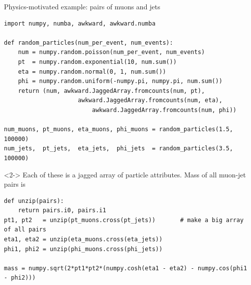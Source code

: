 \documentclass[aspectratio=169]{beamer}
\begin{document}
\begin{frame}[fragile]{Physics-motivated example: pairs of muons and jets}
\vspace{0.15 cm}
\scriptsize
\begin{verbatim}
import numpy, numba, awkward, awkward.numba

def random_particles(num_per_event, num_events):
    num = numpy.random.poisson(num_per_event, num_events)
    pt  = numpy.random.exponential(10, num.sum())
    eta = numpy.random.normal(0, 1, num.sum())
    phi = numpy.random.uniform(-numpy.pi, numpy.pi, num.sum())
    return (num, awkward.JaggedArray.fromcounts(num, pt),
                     awkward.JaggedArray.fromcounts(num, eta),
                         awkward.JaggedArray.fromcounts(num, phi))

num_muons, pt_muons, eta_muons, phi_muons = random_particles(1.5, 100000)
num_jets,  pt_jets,  eta_jets,  phi_jets  = random_particles(3.5, 100000)
\end{verbatim}

\vspace{0.35 cm}
\begin{uncoverenv}<2->
{\normalsize Each of these is a jagged array of particle attributes. Mass of all muon-jet pairs is}

\vspace{0.1 cm}
\begin{verbatim}
def unzip(pairs):
    return pairs.i0, pairs.i1
pt1, pt2   = unzip(pt_muons.cross(pt_jets))       # make a big array of all pairs
eta1, eta2 = unzip(eta_muons.cross(eta_jets))
phi1, phi2 = unzip(phi_muons.cross(phi_jets))

mass = numpy.sqrt(2*pt1*pt2*(numpy.cosh(eta1 - eta2) - numpy.cos(phi1 - phi2)))
\end{verbatim}
\end{uncoverenv}
\end{frame}
\end{document}
